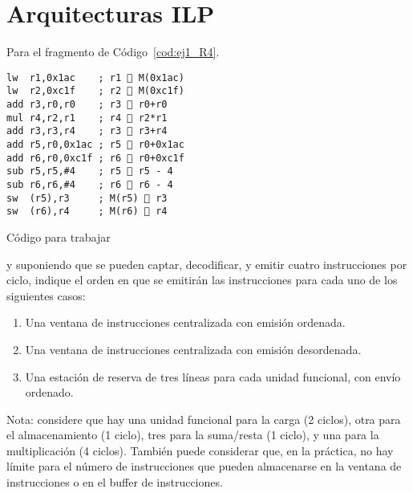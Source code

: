 \section{Arquitecturas ILP}

\begin{ejercicio}
    Para el fragmento de Código~\ref{cod:ej1_R4}.
    \begin{listing}[H]
    \begin{verbatim}
lw  r1,0x1ac    ; r1  M(0x1ac)
lw  r2,0xc1f    ; r2  M(0xc1f)
add r3,r0,r0    ; r3  r0+r0
mul r4,r2,r1    ; r4  r2*r1
add r3,r3,r4    ; r3  r3+r4
add r5,r0,0x1ac ; r5  r0+0x1ac
add r6,r0,0xc1f ; r6  r0+0xc1f
sub r5,r5,#4    ; r5  r5 - 4
sub r6,r6,#4    ; r6  r6 - 4
sw  (r5),r3     ; M(r5)  r3
sw  (r6),r4     ; M(r6)  r4
    \end{verbatim}
    \caption{Código para trabajar}
    \label{cod:ej1_R4}
\end{listing}
y suponiendo que se pueden captar, decodificar, y emitir cuatro instrucciones por ciclo, indique el orden en que se emitirán las instrucciones para cada uno de los siguientes casos:
\begin{enumerate}
    \item Una ventana de instrucciones centralizada con emisión ordenada.
    \item Una ventana de instrucciones centralizada con emisión desordenada.
    \item Una estación de reserva de tres líneas para cada unidad funcional, con envío ordenado.
\end{enumerate}

Nota: considere que hay una unidad funcional para la carga (2 ciclos), otra para el almacenamiento (1 ciclo), tres para la suma/resta (1 ciclo), y una para la multiplicación (4 ciclos). También puede considerar que, en la práctica, no hay límite para el número de instrucciones que pueden almacenarse en la ventana de instrucciones o en el buffer de instrucciones.
\end{ejercicio}

